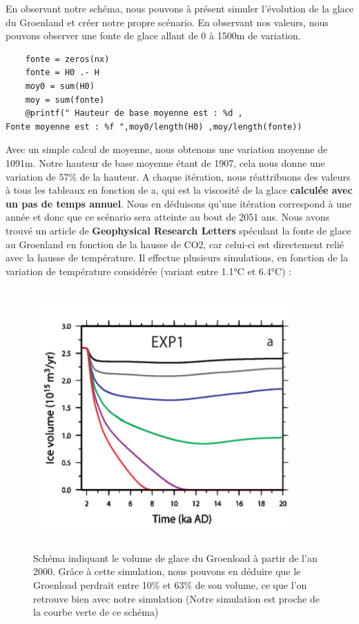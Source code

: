 \documentclass{article}
\begin{document}
En observant notre schéma, nous pouvons à présent simuler l'évolution de la glace du Groenland et créer notre propre scénario. En observant nos valeurs, nous pouvons observer une fonte de glace allant de 0 à 1500m de variation. 
\begin{verbatim}
    fonte = zeros(nx)
    fonte = H0 .- H
    moy0 = sum(H0)
    moy = sum(fonte)
    @printf(" Hauteur de base moyenne est : %d , 
Fonte moyenne est : %f ",moy0/length(H0) ,moy/length(fonte))
\end{verbatim}
\newpage
Avec un simple calcul de moyenne, nous obtenons une variation moyenne de 1091m. Notre hauteur de base moyenne étant de 1907, cela nous donne une variation de 57\% de la hauteur. A chaque itération, nous réattribuons des valeurs à tous les tableaux en fonction de a, qui est la viscosité de la glace \textbf{calculée avec un pas de temps annuel}. Nous en déduisons qu'une itération correspond à une année et donc que ce scénario sera atteinte au bout de 2051 ans. 
\newline
Nous avons trouvé un article de \textbf{ Geophysical Research Letters} \cite{charbit2008amount} spéculant la fonte de glace au Groenland en fonction de la hausse de CO2, car celui-ci est directement relié avec la hausse de température. Il effectue plusieurs simulations, en fonction de la variation de température considérée (variant entre 1.1°C et 6.4°C) : 
\begin{figure}[!htpb]
\centering
\includegraphics[width=10cm, keepaspectratio=true, height=10cm]{Variation.png}
\caption{Schéma indiquant le volume de glace du Groenload à partir de l'an 2000. Grâce à cette simulation, nous pouvons en déduire que le Groenload perdrait entre 10\% et 63\% de son volume, ce que l'on retrouve bien avec notre simulation (Notre simulation est proche de la courbe verte de ce schéma) }
\end{figure}
\newpage
\end{document}
